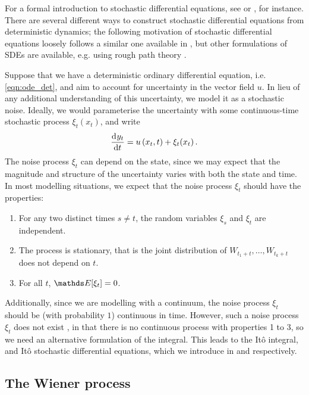 For a formal introduction to stochastic differential equations, see \citet{Oksendal_2003_StochasticDifferentialEquations} or \citet{KallianpurSundar_2014_StochasticAnalysisDiffusion}, for instance.
There are several different ways to construct stochastic differential equations from deterministic dynamics; the following motivation of stochastic differential equations loosely follows a similar one available in \citet{Oksendal_2003_StochasticDifferentialEquations}, but other formulations of SDEs are available, e.g. using rough path theory \citep{FrizVictoir_2010_MultidimensionalStochasticProcesses}.

Suppose that we have a deterministic ordinary differential equation, i.e. \cref{eqn:ode_det}, and aim to account for uncertainty in the vector field \(u\).
In lieu of any additional understanding of this uncertainty, we model it as a stochastic noise.
Ideally, we would parameterise the uncertainty with some continuous-time stochastic process \(\xi_t\!\left(x_t\right)\), and write
\[
	\dod{y_t}{t} = u\left(x_t, t\right) + \xi_t\!\left(x_t\right).
\]
The noise process \(\xi_t\) can depend on the state, since we may expect that the magnitude and structure of the uncertainty varies with both the state and time.
In most modelling situations, we expect that the noise process \(\xi_t\) should have the properties:
\begin{enumerate}
	\item For any two distinct times \(s \neq t\), the random variables \(\xi_s\) and \(\xi_t\) are independent.
	\item The process is stationary, that is the joint distribution of \(W_{t_1 + t}, \dotsc, W_{t_k + t}\) does not depend on \(t\).
	\item For all \(t\), \(\avg{\xi_t} = 0\).
\end{enumerate}
Additionally, since we are modelling with a continuum, the noise process \(\xi_t\) should be (with probability \(1\)) continuous in time.
However, such a noise process \(\xi_t\) does not exist \citep{Oksendal_2003_StochasticDifferentialEquations}, in that there is no  continuous process with properties 1 to 3, so we need an alternative formulation of the integral.
This leads to the It\^o integral, and It\^o stochastic differential equations, which we introduce in  and  respectively.



\subsection{The Wiener process}


